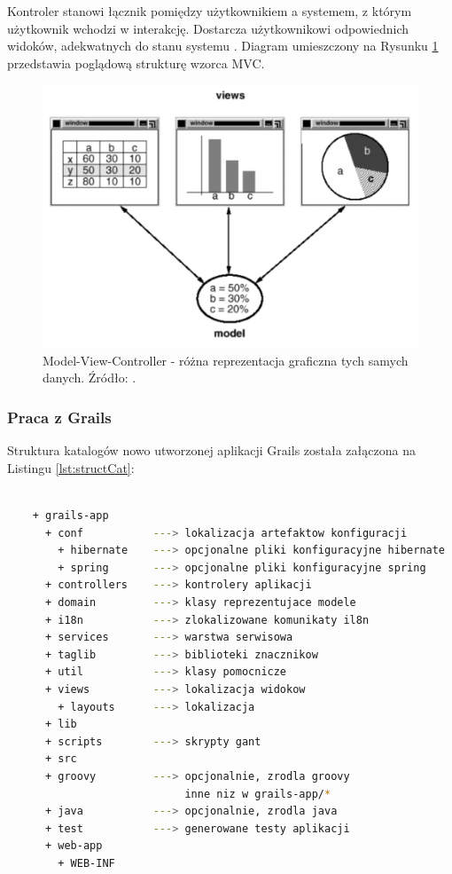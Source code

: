     Kontroler stanowi łącznik pomiędzy użytkownikiem a systemem, z którym użytkownik wchodzi w interakcję. Dostarcza użytkownikowi odpowiednich widoków, adekwatnych do stanu systemu \cite{Trygve79}. Diagram umieszczony na Rysunku \ref{fig:mvc-1} przedstawia poglądową strukturę wzorca MVC.

    \begin{figure}[t]
      \centering
      \includegraphics[width=1.0\textwidth]{img/mvc-1.pdf}
      \caption{Model-View-Controller - różna reprezentacja graficzna tych samych danych. Źródło: \cite{GoF}.}
      \label{fig:mvc-1}
    \end{figure}

    \newpage

    \subsubsection{Praca z Grails}

    Struktura katalogów nowo utworzonej aplikacji Grails została załączona na Listingu \ref{lst:structCat}:

    \begin{lstlisting}[language=sh,caption={Struktura katalogów Grails}, label={lst:structCat}]

    + grails-app
      + conf           ---> lokalizacja artefaktow konfiguracji
        + hibernate    ---> opcjonalne pliki konfiguracyjne hibernate
        + spring       ---> opcjonalne pliki konfiguracyjne spring 
      + controllers    ---> kontrolery aplikacji
      + domain         ---> klasy reprezentujace modele
      + i18n           ---> zlokalizowane komunikaty il8n
      + services       ---> warstwa serwisowa
      + taglib         ---> biblioteki znacznikow
      + util           ---> klasy pomocnicze 
      + views          ---> lokalizacja widokow
        + layouts      ---> lokalizacja 
      + lib
      + scripts        ---> skrypty gant
      + src
      + groovy         ---> opcjonalnie, zrodla groovy 
                            inne niz w grails-app/*
      + java           ---> opcjonalnie, zrodla java 
      + test           ---> generowane testy aplikacji
      + web-app
        + WEB-INF
    \end{lstlisting}

